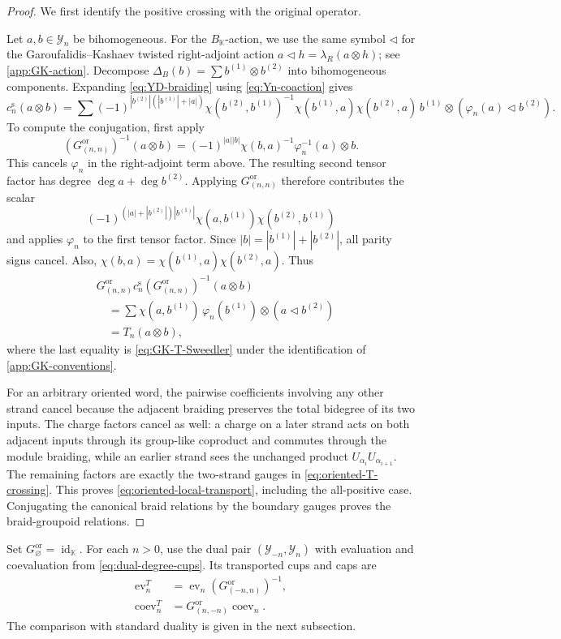 \documentclass[11pt,a4paper]{article}
\newcommand{\hK}{\mathbb K}
\newcommand{\ot}{\otimes}
\newcommand{\tri}{\mathbin{\triangleleft}}
\newcommand{\id}{\operatorname{id}}
\newcommand{\ev}{\operatorname{ev}}
\newcommand{\coev}{\operatorname{coev}}
\theoremstyle{definition}
\theoremstyle{remark}
\begin{document}
\begin{proof}
We first identify the positive crossing with the original operator.

Let \(a,b\in\mathcal Y_n\) be bihomogeneous.  For the
\(B_{\hK}\)-action, we use the same symbol \(\tri\) for the
Garoufalidis--Kashaev twisted right-adjoint action
\(a\tri h=\lambda_R(a\ot h)\); see \cref{app:GK-action}.  Decompose
\(\Delta_B(b)=\sum b^{(1)}\ot b^{(2)}\) into bihomogeneous components.
Expanding \eqref{eq:YD-braiding} using \eqref{eq:Yn-coaction} gives
\[
 c_n^{\mathrm s}(a\ot b)
 =\sum(-1)^{|b^{(2)}|(|b^{(1)}|+|a|)}
 \chi(b^{(2)},b^{(1)})^{-1}
 \chi(b^{(1)},a)\chi(b^{(2)},a)\,
 b^{(1)}\ot(\varphi_n(a)\tri b^{(2)}).
\]
To compute the conjugation, first apply
\[
 (G_{(n,n)}^{\mathrm{or}})^{-1}(a\ot b)
 =(-1)^{|a||b|}\chi(b,a)^{-1}
 \varphi_n^{-1}(a)\ot b.
\]
This cancels \(\varphi_n\) in the right-adjoint term above.
The resulting second tensor factor has degree
\(\deg a+\deg b^{(2)}\).  Applying \(G_{(n,n)}^{\mathrm{or}}\) therefore
contributes the scalar
\[
 (-1)^{(|a|+|b^{(2)}|)|b^{(1)}|}
 \chi(a,b^{(1)})\chi(b^{(2)},b^{(1)})
\]
and applies \(\varphi_n\) to the first tensor factor.
Since \(|b|=|b^{(1)}|+|b^{(2)}|\), all parity signs cancel.
Also,
\(\chi(b,a)=\chi(b^{(1)},a)\chi(b^{(2)},a)\).
Thus
\begin{align*}
 &G_{(n,n)}^{\mathrm{or}}c_n^{\mathrm s}(G_{(n,n)}^{\mathrm{or}})^{-1}(a\ot b)\\
 &\quad=
 \sum\chi(a,b^{(1)})\,
 \varphi_n(b^{(1)})\ot(a\tri b^{(2)})\\
 &\quad=T_n(a\ot b),
\end{align*}
where the last equality is \eqref{eq:GK-T-Sweedler} under the
identification of \cref{app:GK-conventions}.

For an arbitrary oriented word, the pairwise coefficients involving
any other strand cancel because the adjacent braiding preserves the
total bidegree of its two inputs.  The charge factors cancel as well:
a charge on a later strand acts on both adjacent inputs through its
group-like coproduct and commutes through the module braiding, while
an earlier strand sees the unchanged product
\(U_{\alpha_i}U_{\alpha_{i+1}}\).
The remaining factors are exactly the two-strand gauges in
\eqref{eq:oriented-T-crossing}.  This proves
\eqref{eq:oriented-local-transport}, including the all-positive case.
Conjugating the canonical braid relations by the boundary gauges proves
the braid-groupoid relations.
\end{proof}

Set \(G_\varnothing^{\mathrm{or}}=\id_{\hK}\).
For each \(n>0\), use the dual pair \((\mathcal Y_{-n},\mathcal Y_n)\)
with evaluation and coevaluation from \eqref{eq:dual-degree-cups}.
Its transported cups and caps are
\begin{equation}\label{eq:transported-cups}
\begin{aligned}
 \ev_n^T&=\ev_n(G_{(-n,n)}^{\mathrm{or}})^{-1},\\
 \coev_n^T&=G_{(n,-n)}^{\mathrm{or}}\coev_n.
\end{aligned}
\end{equation}
The comparison with standard duality is given in the next subsection.
\end{document}
